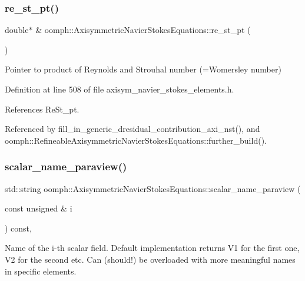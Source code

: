 \subsubsection{\texorpdfstring{re\+\_\+st\+\_\+pt()}{re\_st\_pt()}}
{\footnotesize\ttfamily double$\ast$ \& oomph\+::\+Axisymmetric\+Navier\+Stokes\+Equations\+::re\+\_\+st\+\_\+pt (\begin{DoxyParamCaption}{ }\end{DoxyParamCaption})\hspace{0.3cm}{\ttfamily [inline]}}



Pointer to product of Reynolds and Strouhal number (=Womersley number) 



Definition at line 508 of file axisym\+\_\+navier\+\_\+stokes\+\_\+elements.\+h.



References Re\+St\+\_\+pt.



Referenced by fill\+\_\+in\+\_\+generic\+\_\+dresidual\+\_\+contribution\+\_\+axi\+\_\+nst(), and oomph\+::\+Refineable\+Axisymmetric\+Navier\+Stokes\+Equations\+::further\+\_\+build().

\mbox{\label{classoomph_1_1AxisymmetricNavierStokesEquations_a44ffef8f80dd1419fd6a7b281e2185b3}} 
\subsubsection{\texorpdfstring{scalar\+\_\+name\+\_\+paraview()}{scalar\_name\_paraview()}}
{\footnotesize\ttfamily std\+::string oomph\+::\+Axisymmetric\+Navier\+Stokes\+Equations\+::scalar\+\_\+name\+\_\+paraview (\begin{DoxyParamCaption}\item[{const unsigned \&}]{i }\end{DoxyParamCaption}) const\hspace{0.3cm}{\ttfamily [inline]}, {\ttfamily [virtual]}}



Name of the i-\/th scalar field. Default implementation returns V1 for the first one, V2 for the second etc. Can (should!) be overloaded with more meaningful names in specific elements. 




